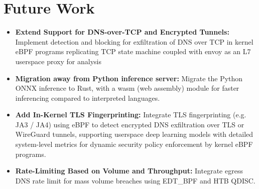 \documentclass [11pt, proquest] {uwthesis}[2020/02/24]
\begin{document}
\section{Future Work}

\begin{itemize}[itemsep=1pt,parsep=0pt]
  \item \textbf{Extend Support for DNS-over-TCP and Encrypted Tunnels:} Implement detection and blocking for exfiltration of DNS over TCP in kernel eBPF  programs replicating TCP state machine coupled with envoy as an L7 userspace proxy for analysis

  \item \textbf{Migration away from Python inference server:} Migrate the Python ONNX inference to Rust, with a wasm (web assembly) module for faster inferencing compared to interpreted languages.

  \item \textbf{Add In-Kernel TLS Fingerprinting:} Integrate TLS fingerprinting (e.g. JA3 / JA4) using eBPF to detect encrypted DNS exfiltration over TLS or WireGuard tunnels, supporting userspace deep learning models with detailed system-level metrics for dynamic security policy enforcement by kernel eBPF programs.




  \item \textbf{Rate-Limiting Based on Volume and Throughput:} Integrate egress DNS rate limit for mass volume breaches using EDT\_BPF and HTB QDISC.


\end{itemize}
\end{document}
